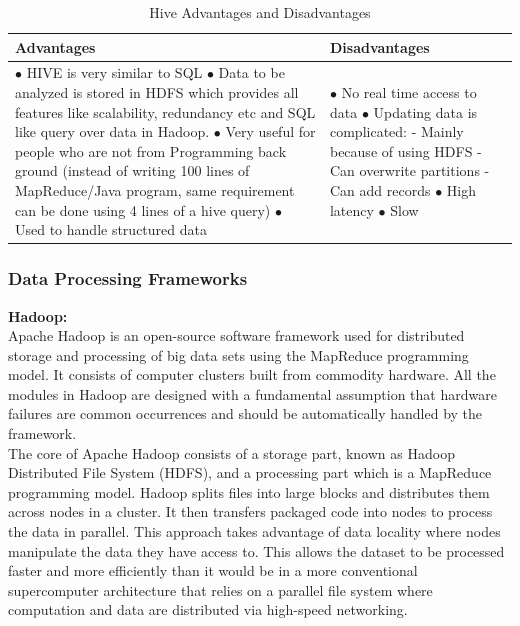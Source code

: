 \begin{table}[H]
\caption{Hive Advantages and Disadvantages}
\begin{center}
\begin{tabularx}{17cm}{ |p{8.5cm}|X| } 
 \hline
 \textbf{Advantages} & \textbf{Disadvantages}  \\ \hline
 $\bullet$ HIVE is very similar to SQL \newline $\bullet$ Data to be analyzed is stored in HDFS which provides all features like scalability, redundancy etc and SQL like query over data in Hadoop. \newline $\bullet$ Very useful for people who are not from Programming back ground (instead of writing 100 lines of MapReduce/Java program, same requirement can be done using 4 lines of a hive query) \newline $\bullet$ Used to handle structured data & $\bullet$ No real time access to data \newline $\bullet$ Updating data is complicated: \newline - Mainly because of using HDFS \newline - Can overwrite partitions \newline - Can add records \newline $\bullet$ High latency \newline $\bullet$ Slow  \\ \hline

\end{tabularx}
\end{center}
\end{table}

\subsubsection{Data Processing Frameworks}
\textbf{\normalsize{Hadoop:}}\\

Apache Hadoop is an open-source software framework used for distributed storage and processing of big data sets using the MapReduce programming model. It consists of computer clusters built from commodity hardware. All the modules in Hadoop are designed with a fundamental assumption that hardware failures are common occurrences and should be automatically handled by the framework.\\

The core of Apache Hadoop consists of a storage part, known as Hadoop Distributed File System (HDFS), and a processing part which is a MapReduce programming model. Hadoop splits files into large blocks and distributes them across nodes in a cluster. It then transfers packaged code into nodes to process the data in parallel. This approach takes advantage of data locality where nodes manipulate the data they have access to. This allows the dataset to be processed faster and more efficiently than it would be in a more conventional supercomputer architecture that relies on a parallel file system where computation and data are distributed via high-speed networking.\\

